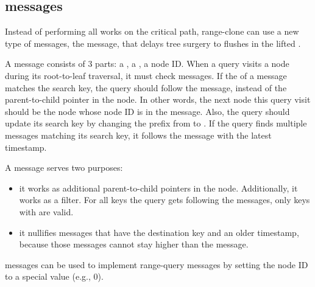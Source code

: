 \subsection{\goto messages}

Instead of performing all works on the critical path, range-clone can use a
new type of messages, the \goto message, that delays tree surgery to flushes
in the lifted \bedag.

A \goto message consists of 3 parts: a \dpre, a \spre, a node ID.
When a query visits a node during its root-to-leaf traversal, it must check
\goto messages.
If the \dpre of a \goto message matches the search key, the query should follow
the \goto message, instead of the parent-to-child pointer in the node.
In other words, the next node this query visit should be the node whose node ID
is in the \goto message.
Also, the query should update its search key by changing the prefix from \dpre
to \spre.
If the query finds multiple \goto messages matching its search key, it follows
the \goto message with the latest timestamp.

A \goto message serves two purposes:
\begin{itemize}
\item it works as additional parent-to-child pointers in the node.
Additionally, it works as a filter.
For all keys the query gets following the \goto messages, only keys with \spre
are valid.
\item it nullifies messages that have the destination key and an older
timestamp, because those messages cannot stay higher than the \goto message.
\end{itemize}
\goto messages can be used to implement range-query messages by setting the node
ID to a special value (e.g., 0).

